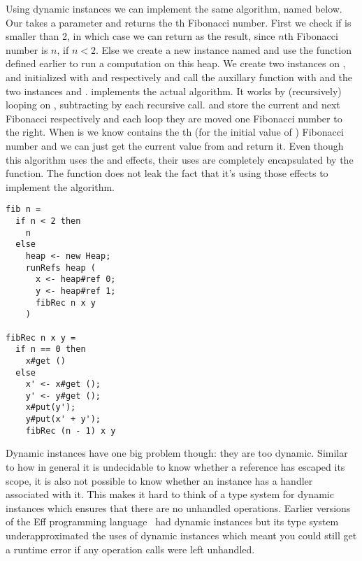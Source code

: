 Using dynamic instances we can implement the same algorithm, named  below.
Our  takes a parameter  and returns the th Fibonacci number.
First we check if  is smaller than 2, in which case we can return  as the result, since $n$th Fibonacci number is $n$, if $n < 2$.
Else we create a new  instance named  and use the  function defined earlier to run a computation on this heap.
We create two  instances on ,  and  initialized with  and  respectively and call the auxillary function  with  and the two instances  and .
 implements the actual algorithm.
It works by (recursively) looping on , subtracting by  each recursive call.
 and  store the current and next Fibonacci respectively and each loop they are moved one Fibonacci number to the right.
When  is  we know  contains the th (for the initial value of ) Fibonacci number and we can just get the current value from  and return it.
Even though this algorithm uses the  and  effects, their uses are completely encapsulated by the  function.
The  function does not leak the fact that it's using those effects to implement the algorithm.

\begin{verbatim}
fib n =
  if n < 2 then
    n
  else
    heap <- new Heap;
    runRefs heap (
      x <- heap#ref 0;
      y <- heap#ref 1;
      fibRec n x y
    )

fibRec n x y =
  if n == 0 then
    x#get ()
  else
    x' <- x#get ();
    y' <- y#get ();
    x#put(y');
    y#put(x' + y');
    fibRec (n - 1) x y
\end{verbatim}

Dynamic instances have one big problem though: they are too dynamic. Similar to how in general it is undecidable to know whether a reference has escaped its scope, it is also not possible to know whether an instance has a handler associated with it. This makes it hard to think of a type system for dynamic instances which ensures that there are no unhandled operations. Earlier versions of the Eff programming language~\autocite{eff1} had dynamic instances but its type system underapproximated the uses of dynamic instances which meant you could still get a runtime error if any operation calls were left unhandled.
